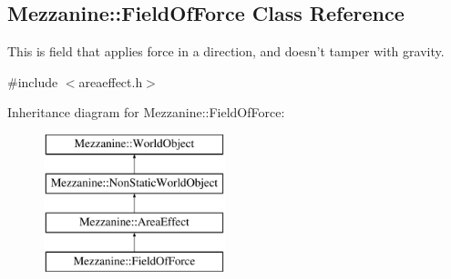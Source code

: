 \hypertarget{classMezzanine_1_1FieldOfForce}{
\subsection{Mezzanine::FieldOfForce Class Reference}
\label{classMezzanine_1_1FieldOfForce}
}


This is field that applies force in a direction, and doesn't tamper with gravity.  




{\ttfamily \#include $<$areaeffect.h$>$}

Inheritance diagram for Mezzanine::FieldOfForce:\begin{figure}[H]
\begin{center}
\leavevmode
\includegraphics[height=4.000000cm]{classMezzanine_1_1FieldOfForce}
\end{center}
\end{figure}

